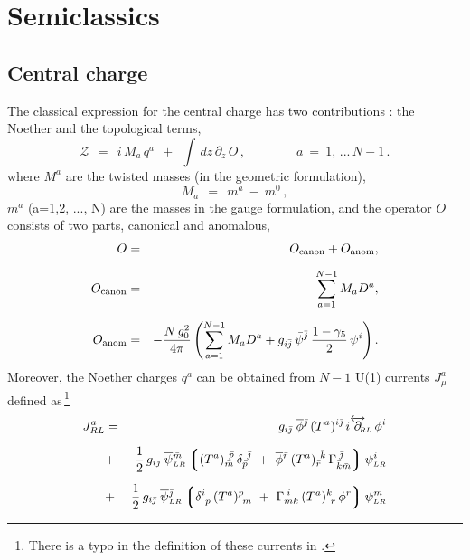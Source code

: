 \documentclass[epsfig,12pt]{article}
\def\beq{\begin{equation}}
\def\eeq{\end{equation}}
\def\beq{\begin{equation}}
\def\eeq{\end{equation}}
\newcommand{\p}{\partial}
\newcommand{\ov}{\overline}
\newcommand{\mc}[1]{\mathcal{#1}}
\newcommand{\lgr}{\left\lgroup}
\newcommand{\rgr}{\right\rgroup}
\newcommand{\bpsi}{\ov{\psi}{}}
\newcommand{\bphi}{\ov{\phi}{}}
\newcommand{\bj}{{\bar \jmath}}
\newcommand{\bmm}{{\bar m}}
\newcommand{\bp}{{\bar p}}
\newcommand{\bkk}{{\bar k}}
\newcommand{\br}{{\bar r}}
\begin{document}
\section{Semiclassics}
\setcounter{equation}{0}


\subsection{Central charge}

       The classical expression for the central charge has two contributions \cite{ls1}:
       the Noether and the topological terms,
\beq
        \mc{Z} ~~=~~ i\, M_a\, q^a  ~~+~~ \int\, dz\, \p_z\, O \,, \qquad\qquad
	a ~=~ 1,\,...\, N-1\,.
	\label{21}
\eeq
       where $ M^a $ are the twisted masses (in the geometric formulation),
\beq
       M_a  ~~=~~ m^a ~-~ m^0\,,
\eeq
$m^a$ (a=1,2, ..., N) are the masses in the gauge formulation, and the operator $O$ consists of two parts, canonical and anomalous,
\begin{eqnarray}
O & = &
O_{\rm canon} + O_{\rm anom},\\[2mm]
O_{\rm canon } 
\label{23}
& = &
\sum_{a= 1}^{N-1} M_a D^a,\\[2mm]
O_{\rm anom} 
\label{24}
& = &
- \frac{N\, g_0^2}{4\pi}\left(
\sum_{a=1}^{N-1} M_a D^a + g_{i\bar{j}} \,\bar \psi^{\bar{j}}\,\frac{1-\gamma_5}{2}\,\psi^i
\right).
\label{25}
\end{eqnarray}
Moreover, the Noether charges $ q^a $ can be obtained from $N-1$ U(1) currents $ J_\mu^a $
defined as\,\footnote{There is a typo in the definition of these currents in \cite{ls1}.}
\begin{eqnarray}
%
       J_{RL}^a  
       &=&
        g_{i\bj}\; \bphi^\bj\, (T^a)^{i\bj}\, i\overleftrightarrow{\p}{}_{\scriptscriptstyle \!\!\!\!RL}\, \phi^i   \nonumber\\[2mm]
%
                 & +&
                  \frac{1}{2}\, g_{i\bj}\; \bpsi{}_{\scriptscriptstyle LR}^\bmm 
                         \lgr  ( T^a )_\bmm^{\ \bp}\, \delta_\bp^{\ \bj} ~+~ 
	                       \bphi{}^\br\, (T^a)_\br^{\ \bkk}\, \Gamma^{\;\bj}_{\bkk\bmm} \rgr   \psi_{\scriptscriptstyle LR}^i \nonumber \\[2mm]
%
                 & +&
                  \frac{1}{2}\, g_{i\bj}\; \bpsi{}_{\scriptscriptstyle LR}^\bj
                         \lgr  \delta^i_{\ p}\, (T^a)^p_{\ m} ~+~ 
		               \Gamma_{mk}^{\;i}\, (T^a)^k_{\ r}\, \phi^r \rgr   \psi_{\scriptscriptstyle LR}^m
\label{u1cur}
\end{eqnarray}
\end{document}
